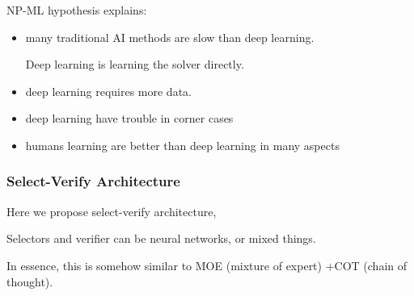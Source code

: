 \documentclass{beamer}   	%
\theoremstyle{definition}
\begin{document}
\begin{frame}
NP-ML hypothesis explains:
\begin{itemize}
	\item many traditional AI methods are slow than deep learning.

	Deep learning is learning the solver directly.
	\item deep learning requires more data.
	\item deep learning have trouble in corner cases 
	\item humans learning are better than deep learning in many aspects
\end{itemize}
\end{frame}

\begin{frame}
\frametitle{Select-Verify Architecture}

Here we propose select-verify architecture,
\begin{center}
\end{center}

Selectors and verifier can be neural networks, or mixed things.

In essence, this is somehow similar to MOE (mixture of expert) +COT (chain of thought).

\end{frame}
\end{document}
